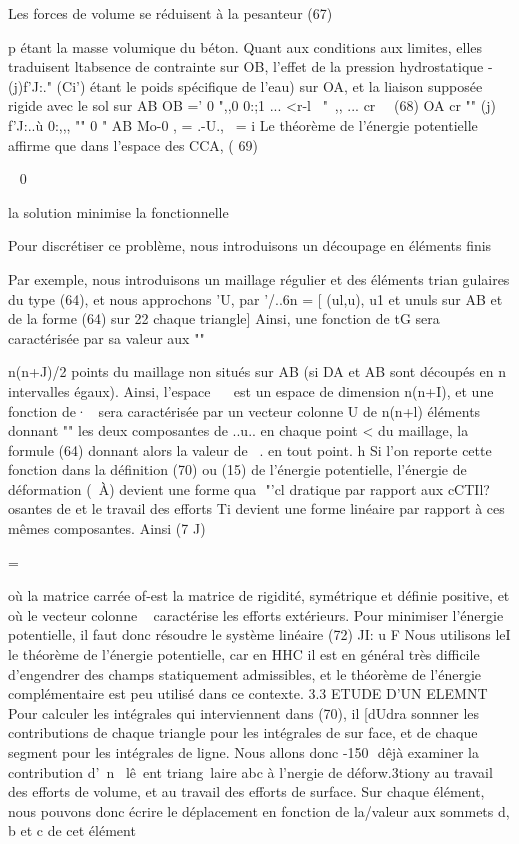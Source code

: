 {{{{{{{{{Les forces de volume se réduisent à la pesanteur 
(67) 

p étant la masse volumique du béton. Quant aux conditions aux limites, elles traduisent ltabsence de contrainte sur OB, l'effet de la pression hydrostatique -(j)f'J:." (Ci') étant le poids spé­cifique de l'eau) sur OA, et la liaison supposée rigide avec le sol sur AB 
OB =' 0 ",,0
0:;1 ... <r-l~ "~,, ... cr~~ 
(68) OA cr "" (j) f'J:..ù 0:,,, "" 0
" 
AB Mo-0
, = .-U.,~ =
i 
Le théorème de l'énergie potentielle affirme que dans l'espace des CCA, 
( 69) 

~ 0 

la solution minimise la fonctionnelle 

Pour discrétiser ce problème, nous introduisons un découpage en éléments finis 

Par exemple, nous introduisons un maillage régulier et des éléments trian­
gulaires du type (64), et nous approchons 'U, par '/..6n = [ (ul,u), u1 et unuls sur AB et de la forme (64) sur
22 chaque triangle] 
Ainsi, une fonction de tG sera caractérisée par sa valeur aux 
"" 

n(n+J)/2 points du maillage non situés sur AB (si DA et AB sont découpés en n intervalles égaux). Ainsi, l'espace ~~ est un espace de dimension n(n+I), et une fonction de·~ sera caractérisée par un vecteur colonne 
U de n(n+l) éléments donnant "" les deux composantes de ..u.. en chaque point
<­
du maillage, la formule (64) donnant alors la valeur de ~. en tout point.
h 
Si l'on reporte cette fonction dans la définition (70) ou (15) de l'éner­gie potentielle, l'énergie de déformation \V(~À) devient une forme qua­
 "'cl
dratique par rapport aux cCTIl?osantes de \! et le travail des efforts Ti 
devient une forme linéaire par rapport à ces mêmes composantes. Ainsi 
(7 J) 

= 

où la matrice carrée of-est la matrice de rigidité, symétrique et définie 
positive, et où le vecteur colonne ~ caractérise les efforts extérieurs. Pour minimiser l'énergie potentielle, il faut donc résoudre le système 
linéaire 
(72) JI: u F 
Nous utilisons leI le théorème de l'énergie potentielle, car en 
HHC il est en général très difficile d'engendrer des champs statiquement 
admissibles, et le théorème de l'énergie complémentaire est peu utilisé dans ce contexte. 
3.3 ETUDE D'UN ELEMNT 
Pour calculer les intégrales qui interviennent dans (70), il [dU­dra sonnner les contributions de chaque triangle pour les intégrales de sur face, et de chaque segment pour les intégrales de ligne. Nous allons donc 
-150 ­
dêjà examiner la contribution d'~n ~lê~ent triang~laire abc à l'nergie de déforw.3tiony au travail des efforts de volume, et au travail des efforts de surface. 
Sur chaque élément, nous pouvons donc écrire le déplacement en fonction de la/valeur aux sommets d, b et c de cet élément 

}}}}}}}}}
